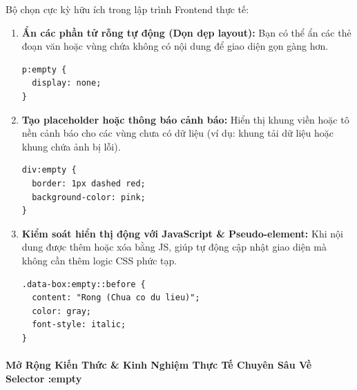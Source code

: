 \begin{conceptBox}
Bộ chọn  cực kỳ hữu ích trong lập trình Frontend thực tế:
\begin{enumerate}[leftmargin=1.5em, itemsep=4pt, parsep=0pt]
    \item \textbf{Ẩn các phần tử rỗng tự động (Dọn dẹp layout):} Bạn có thể ẩn các thẻ đoạn văn  hoặc vùng chứa không có nội dung để giao diện gọn gàng hơn.
\begin{codeWindow}
\begin{lstlisting}[language=CSS3]
p:empty {
  display: none;
}
\end{lstlisting}
\end{codeWindow}

    \item \textbf{Tạo placeholder hoặc thông báo cảnh báo:} Hiển thị khung viền hoặc tô nền cảnh báo cho các vùng chưa có dữ liệu (ví dụ: khung tải dữ liệu hoặc khung chứa ảnh bị lỗi).
\begin{codeWindow}
\begin{lstlisting}[language=CSS3]
div:empty {
  border: 1px dashed red;
  background-color: pink;
}
\end{lstlisting}
\end{codeWindow}

    \item \textbf{Kiểm soát hiển thị động với JavaScript \& Pseudo-element:} Khi nội dung được thêm hoặc xóa bằng JS,  giúp tự động cập nhật giao diện mà không cần thêm logic CSS phức tạp.
\begin{codeWindow}
\begin{lstlisting}[language=CSS3]
.data-box:empty::before {
  content: "Rong (Chua co du lieu)";
  color: gray;
  font-style: italic;
}
\end{lstlisting}
\end{codeWindow}
\end{enumerate}
\end{conceptBox}


\paragraph{Mở Rộng Kiến Thức \& Kinh Nghiệm Thực Tế Chuyên Sâu Về Selector :empty}
\mbox{}\par\vspace{2pt}

